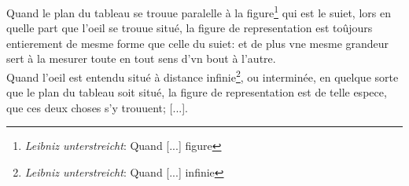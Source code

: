 \pend \pstart [p.~55] Quand le plan du tableau se trouue paralelle \`{a} la figure\footnote{\textit{Leibniz unterstreicht}: Quand [...] figure} qui est le suiet, lors en quelle part que l'oeil\protect{} se trouue situ\'{e}, la figure de representation est to\^{u}jours entierement de mesme forme que celle du suiet: et de plus vne mesme grandeur sert \`{a} la mesurer toute en tout sens d'vn bout \`{a} l'autre.\\Quand l'oeil\protect{} est entendu situ\'{e} \`{a} distance infinie\footnote{\textit{Leibniz unterstreicht}: Quand [...] infinie}, ou intermin\'{e}e, en quelque sorte que le plan du tableau soit situ\'{e}, la figure de representation est de telle espece, que ces deux choses s'y trouuent; [...].\pend 